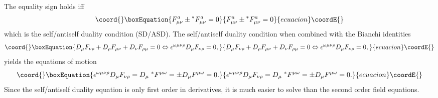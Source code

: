 \documentclass[a4paper,12pt]{book}
\begin{document}
The equality sign holds iff 
\begin{equation}\coord{}\boxEquation{
F_{\mu \nu }^{a}\pm {}^{*}F_{\mu \nu }^{a}=0  \label{seldua}
}{
F_{\mu \nu }^{a}\pm {}^{*}F_{\mu \nu }^{a}=0  }{ecuacion}\coordE{}\end{equation}
which is the self/antiself duality condition (SD/ASD). The self/antiself
duality condition when combined with the Bianchi identities 
\begin{equation}\coord{}\boxEquation{
D_{\mu }F_{\nu \rho }+D_{\rho }F_{\mu \nu }+D_{\nu }F_{\rho \mu
}=0\Leftrightarrow \epsilon ^{\omega \mu \nu \rho }D_{\mu }F_{\nu \rho }=0,
}{
D_{\mu }F_{\nu \rho }+D_{\rho }F_{\mu \nu }+D_{\nu }F_{\rho \mu
}=0\Leftrightarrow \epsilon ^{\omega \mu \nu \rho }D_{\mu }F_{\nu \rho }=0,
}{ecuacion}\coordE{}\end{equation}
yields the equations of motion 
\begin{equation}\coord{}\boxEquation{
\epsilon ^{\omega \mu \nu \rho }D_{\mu }F_{\nu \rho }=D_{\mu }\;^{*}F^{\mu
\omega }=\pm D_{\mu }F^{\mu \omega }=0.
}{
\epsilon ^{\omega \mu \nu \rho }D_{\mu }F_{\nu \rho }=D_{\mu }\;^{*}F^{\mu
\omega }=\pm D_{\mu }F^{\mu \omega }=0.
}{ecuacion}\coordE{}\end{equation}
Since the self/antiself duality equation is only first order in derivatives,
it is much easier to solve than the second order field equations.
\end{document}
